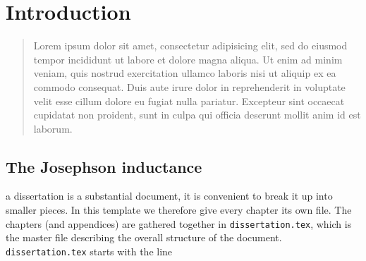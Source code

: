 \newchapstyle
\chapter{Introduction}
\label{chap:intro}


\begin{abstract}
Lorem ipsum dolor sit amet, consectetur adipisicing elit, sed do eiusmod tempor incididunt ut labore et dolore magna aliqua. Ut enim ad minim veniam, quis nostrud exercitation ullamco laboris nisi ut aliquip ex ea commodo consequat. Duis aute irure dolor in reprehenderit in voluptate velit esse cillum dolore eu fugiat nulla pariatur. Excepteur sint occaecat cupidatat non proident, sunt in culpa qui officia deserunt mollit anim id est laborum.
\end{abstract}

\afterpage{\pagecolor{none}}\newpage

\section{The Josephson inductance}

 a dissertation is a substantial document, it is convenient to break it up into smaller pieces. In this template we therefore give every chapter its own file. The chapters (and appendices) are gathered together in \texttt{dissertation.tex}, which is the master file describing the overall structure of the document. \texttt{dissertation.tex} starts with the line




